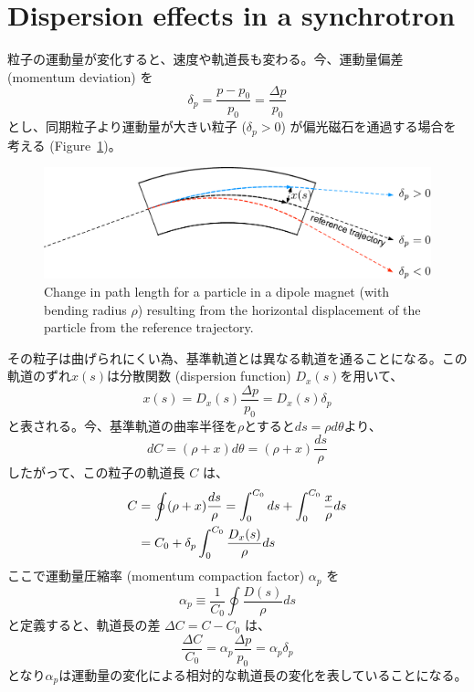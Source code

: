 \documentclass[10pt,a4paper]{ltjsarticle}
\begin{document}
\section{Dispersion effects in a synchrotron}
粒子の運動量が変化すると、速度や軌道長も変わる。今、運動量偏差 (momentum deviation) を
%
\begin{equation}
    \delta_p = \frac{p-p_0}{p_0}=\frac{\Delta p}{p_0}
\end{equation}
%
とし、同期粒子より運動量が大きい粒子 ($\delta_p >0$) が偏光磁石を通過する場合を考える (Figure~\ref{dispersion})。
%
\begin{figure}[hbt]
    \begin{center}
      \includegraphics[width=15cm,clip]{figs/dispersion.pdf}
      \caption{Change in path length for a particle in a dipole magnet (with bending radius $\rho$) resulting from the horizontal displacement of the particle from the reference trajectory.}
      \label{dispersion}
    \end{center}
\end{figure}
%
その粒子は曲げられにくい為、基準軌道とは異なる軌道を通ることになる。この軌道のずれ$x(s)$は分散関数 (dispersion function) $D_x(s)$を用いて、
%
\begin{equation}
    x(s) = D_x(s)\frac{\Delta p}{p_0} = D_x(s)\delta_p 
\end{equation}
%
と表される。今、基準軌道の曲率半径を$\rho$とすると$ds = \rho d\theta$より、
%
\begin{equation}
    dC = (\rho + x) d\theta = (\rho + x) \frac{ds}{\rho}
\end{equation}
%
したがって、この粒子の軌道長 $C$ は、
%
\begin{align}
    C &= \oint (\rho + x)\frac{ds}{\rho} = \int_0^{C_0} ds + \int_0^{C_0}\frac{x}{\rho} ds \notag \\
    &= C_0 + \delta_p \int_0^{C_0}\frac{D_x(s)}{\rho} ds
\end{align}
%
ここで運動量圧縮率 (momentum compaction factor) $\alpha_p$ を
%
\begin{equation}
    \alpha_p \equiv \frac{1}{C_0} \oint \frac{D(s)}{\rho} ds
\end{equation}
%
と定義すると、軌道長の差 $\Delta C = C-C_0$ は、
%
\begin{equation}
    \frac{\Delta C}{C_0}=\alpha_p\frac{\Delta p}{p_0}=\alpha_p\delta_p
    \label{delta_C}
\end{equation}
%
となり$\alpha_p$は運動量の変化による相対的な軌道長の変化を表していることになる。
\end{document}
